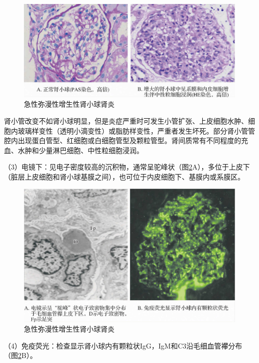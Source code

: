 \begin{figure}[!htbp]
 \centering
 \includegraphics{./images/Image00157.jpg}
 \captionsetup{justification=centering}
 \caption{急性弥漫性增生性肾小球肾炎}
 \label{fig10-11}
  \end{figure} 

肾小管改变不如肾小球明显，但是炎症严重时可发生小管扩张、上皮细胞水肿、细胞内玻璃样变性（透明小滴变性）或脂肪样变性，严重者发生坏死。部分肾小管管腔内出现蛋白管型、红细胞或白细胞管型及颗粒管型。肾间质常有不同程度的充血、水肿和少量淋巴细胞、中性粒细胞浸润。

（3）电镜下：见电子密度较高的沉积物，通常呈驼峰状（图\ref{fig10-12}A），多位于上皮下（脏层上皮细胞和肾小球基膜之间），也可位于内皮细胞下、基膜内或系膜区。

\begin{figure}[!htbp]
 \centering
 \includegraphics{./images/Image00158.jpg}
 \captionsetup{justification=centering}
 \caption{急性弥漫性增生性肾小球肾炎}
 \label{fig10-12}
  \end{figure} 

（4）免疫荧光：检查显示肾小球内有颗粒状IgG，IgM和C3沿毛细血管襻分布（图\ref{fig10-12}B）。

